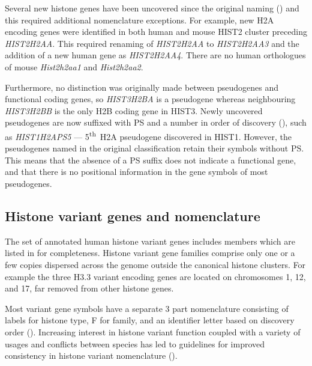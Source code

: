     Several new histone genes have been uncovered since the original naming ()
    and this required additional nomenclature exceptions.
    For example, new H2A encoding genes were identified in both human and mouse HIST2 cluster preceding \textit{HIST2H2AA}.
    This required renaming of \textit{HIST2H2AA} to \textit{HIST2H2AA3}
    and the addition of a new human gene as \textit{HIST2H2AA4}.
    There are no human orthologues of mouse \textit{Hist2h2aa1} and \textit{Hist2h2aa2}.

    Furthermore, no distinction was originally made between pseudogenes and functional coding genes,
    so \textit{HIST3H2BA} is a pseudogene whereas neighbouring \textit{HIST3H2BB} is the only H2B coding gene in HIST3.
    Newly uncovered pseudogenes are now suffixed with PS and a number in order of discovery (),
    such as \textit{HIST1H2APS5} --- 5\textsuperscript{th}~H2A pseudogene discovered in HIST1.
    However, the pseudogenes named in the original classification retain their symbols without PS.
    This means that the absence of a PS suffix does not indicate a functional gene,
    and that there is no positional information in the gene symbols of most pseudogenes.

  \subsection{Histone variant genes and nomenclature}
    The set of annotated human histone variant genes
    includes  members
    which are listed in  for completeness.
    Histone variant gene families comprise only one or a few copies
    dispersed across the genome outside the canonical histone clusters.
    For example the three H3.3 variant encoding genes are located
    on chromosomes 1, 12, and 17, far removed from other histone genes.

    Most variant gene symbols have a separate 3 part nomenclature
    consisting of labels for histone type, F for family,
    and an identifier letter based on discovery order ().
    Increasing interest in histone variant function \citep{MazeAllis2014}
    coupled with a variety of usages and conflicts between species
    has led to guidelines for improved consistency in histone variant nomenclature
    \citep{Talbert2012} ().
